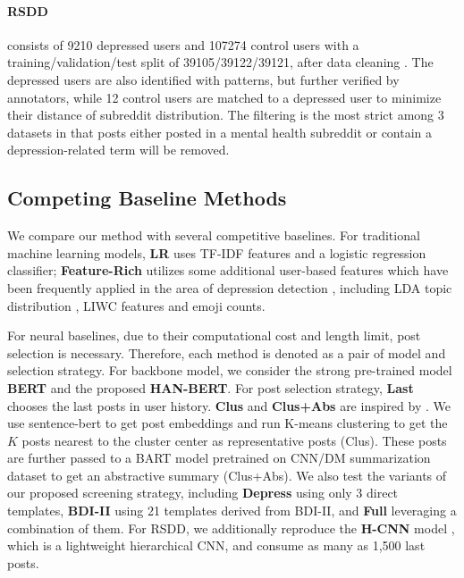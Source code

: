 \paragraph{RSDD} consists of 9210 depressed users and 107274 control users with a training/validation/test split of 39105/39122/39121, after data cleaning \citep{yates2017depression}. The depressed users are also identified with patterns, but further verified by annotators, while 12 control users are matched to a depressed user to minimize their distance of subreddit distribution. The filtering is the most strict among 3 datasets in that posts either posted in a mental health subreddit or contain a depression-related term will be removed. 


\subsection{Competing Baseline Methods}
We compare our method with several competitive baselines. For traditional machine learning models, \textbf{LR} uses TF-IDF features and a logistic regression classifier; \textbf{Feature-Rich} utilizes some additional user-based features which have been frequently applied in the area of depression detection \citep{trotzek2018utilizing,harrigian2020models}, including LDA topic distribution \citep{blei2003latent}, LIWC features \citep{pennebaker2001linguistic} and emoji counts. 

For neural baselines, due to their computational cost and length limit, post selection is necessary. Therefore, each method is denoted as a pair of model and selection strategy. For backbone model, we consider the strong pre-trained model \textbf{BERT} and the proposed \textbf{HAN-BERT}. For post selection strategy, \textbf{Last} chooses the last posts in user history. \textbf{Clus} and \textbf{Clus+Abs} are inspired by \citet{zogan2021depressionnet}. We use sentence-bert \citep{reimers-2019-sentence-bert} to get post embeddings and run K-means clustering to get the $K$ posts nearest to the cluster center as representative posts (Clus). These posts are further passed to a BART model \citep{lewis2020bart} pretrained on CNN/DM summarization dataset to get an abstractive summary (Clus+Abs). We also test the variants of our proposed screening strategy, including \textbf{Depress} using only 3 direct templates, \textbf{BDI-II} using 21 templates derived from BDI-II, and \textbf{Full} leveraging a combination of them. For RSDD, we additionally reproduce the \textbf{H-CNN} model \citep{yates2017depression}, which is a lightweight hierarchical CNN, and consume as many as 1,500 last posts.

